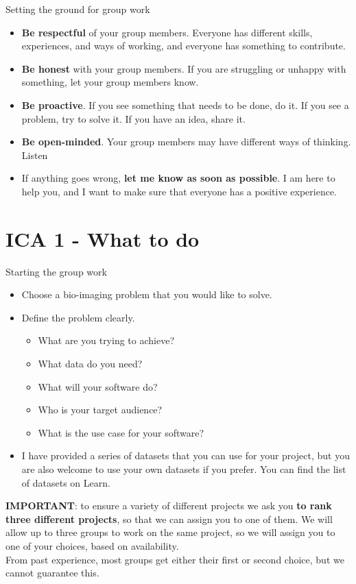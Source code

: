 \documentclass[9pt, aspectratio=169]{beamer}
\begin{document}
\begin{frame}
    {Setting the ground for group work}
    \begin{itemize}
        \item \textbf{Be respectful} of your group members. Everyone has different skills, experiences, and ways of working, and everyone has something to contribute.
        \item \textbf{Be honest} with your group members. If you are struggling or unhappy with something, let your group members know.
        \item \textbf{Be proactive}. If you see something that needs to be done, do it. If you see a problem, try to solve it. If you have an idea, share it.
        \item \textbf{Be open-minded}. Your group members may have different ways of thinking. Listen
        \item If anything goes wrong, \textbf{let me know as soon as possible}. I am here to help you, and I want to make sure that everyone has a positive experience.
    \end{itemize}
\end{frame}

\section{ICA 1 - What to do}

\begin{frame}
    {Starting the group work}
    \begin{itemize}
        \item Choose a bio-imaging problem that you would like to solve.
        \item Define the problem clearly.
              \begin{itemize}
                  \item What are you trying to achieve?
                  \item What data do you need?
                  \item What will your software do?
                  \item Who is your target audience?
                  \item What is the use case for your software?
              \end{itemize}
        \item I have provided a series of datasets that you can use for your project, but you are also welcome to use your own datasets if you prefer. You can find the list of datasets on Learn.
    \end{itemize}

    \pause

    \textbf{IMPORTANT}: to ensure a variety of different projects we ask you \textbf{to rank three different projects}, so that we can assign you to one of them.
    We will allow up to three groups to work on the same project, so we will assign you to one of your choices, based on availability.\\
    From past experience, most groups get either their first or second choice, but we cannot guarantee this.
\end{frame}
\end{document}
